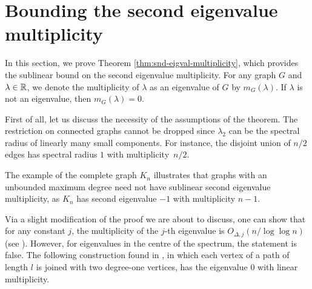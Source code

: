 


\section{Bounding the second eigenvalue multiplicity} 
    \label{section:snd-eigval-multiplicity}
In this section, we prove Theorem \ref{thm:snd-eigval-multiplicity}, which provides the sublinear bound on the second eigenvalue multiplicity.
For any graph $G$ and $\lambda \in \mathbb{R}$, we denote the multiplicity of $\lambda$ as an eigenvalue of $G$ by $m_G(\lambda)$.
If $\lambda$ is not an eigenvalue, then $m_G(\lambda) = 0$.

First of all, let us discuss the necessity of the assumptions of the theorem. 
The restriction on connected graphs cannot be dropped since $\lambda_2$ can be the spectral radius of linearly many small components.  
For instance, the disjoint union of $n / 2$ edges has spectral radius $1$ with \mbox{multiplicity $n/2$}.

The example of the complete graph $K_n$ illustrates that graphs with an unbounded maximum degree need not have sublinear second eigenvalue multiplicity, as $K_n$ has second eigenvalue $-1$ with multiplicity $n - 1$.

Via a slight modification of the proof we are about to discuss, one can show that for any constant $j$, the multiplicity of the $j$-th eigenvalue is $O_{\Delta, j} (n / \log \log n)$ (see \cite{equiangular}).
However, for eigenvalues in the centre of the spectrum, the statement is false.
The following construction found in \cite{equiangularexpository}, in which each vertex of a path of length $l$ is joined with two degree-one vertices, has the eigenvalue $0$ with linear multiplicity.


